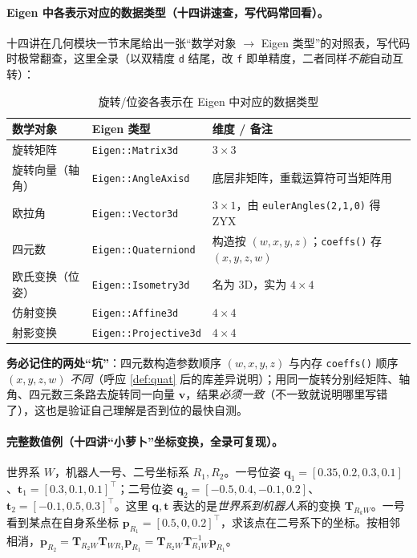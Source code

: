 \paragraph{Eigen 中各表示对应的数据类型（十四讲速查，写代码常回看）。}十四讲在几何模块一节末尾给出一张“数学对象 $\to$ Eigen 类型”的对照表，写代码时极常翻查，这里全录（以双精度 \texttt{d} 结尾，改 \texttt{f} 即单精度，二者同样\emph{不能}自动互转）：
\begin{table}[H]\centering\small
\caption{旋转/位姿各表示在 Eigen 中对应的数据类型}
\label{tab:rb-eigen-types}
\begin{tabular}{lll}
\toprule
数学对象 & Eigen 类型 & 维度 / 备注 \\
\midrule
旋转矩阵 & \texttt{Eigen::Matrix3d} & $3\times3$ \\
旋转向量（轴角） & \texttt{Eigen::AngleAxisd} & 底层非矩阵，重载运算符可当矩阵用 \\
欧拉角 & \texttt{Eigen::Vector3d} & $3\times1$，由 \texttt{eulerAngles(2,1,0)} 得 ZYX \\
四元数 & \texttt{Eigen::Quaterniond} & 构造按 $(w,x,y,z)$；\texttt{coeffs()} 存 $(x,y,z,w)$ \\
欧氏变换（位姿） & \texttt{Eigen::Isometry3d} & 名为 3D，实为 $4\times4$ \\
仿射变换 & \texttt{Eigen::Affine3d} & $4\times4$ \\
射影变换 & \texttt{Eigen::Projective3d} & $4\times4$ \\
\bottomrule
\end{tabular}
\end{table}
\noindent\textbf{务必记住的两处“坑”}：四元数构造参数顺序 $(w,x,y,z)$ 与内存 \texttt{coeffs()} 顺序 $(x,y,z,w)$ \emph{不同}（呼应 \cref{def:quat} 后的库差异说明）；用同一旋转分别经矩阵、轴角、四元数三条路去旋转同一向量 $\mathbf{v}$，结果\emph{必须一致}（不一致就说明哪里写错了），这也是验证自己理解是否到位的最快自测。

\paragraph{完整数值例（十四讲“小萝卜”坐标变换，全录可复现）。}世界系 $W$，机器人一号、二号坐标系 $R_1,R_2$。一号位姿 $\mathbf{q}_1=[0.35,0.2,0.3,0.1]$、$\mathbf{t}_1=[0.3,0.1,0.1]^\top$；二号位姿 $\mathbf{q}_2=[-0.5,0.4,-0.1,0.2]$、$\mathbf{t}_2=[-0.1,0.5,0.3]^\top$。这里 $\mathbf{q},\mathbf{t}$ 表达的是\emph{世界系到机器人系}的变换 $\mathbf{T}_{R_kW}$。一号看到某点在自身系坐标 $\mathbf{p}_{R_1}=[0.5,0,0.2]^\top$，求该点在二号系下的坐标。按相邻相消，$\mathbf{p}_{R_2}=\mathbf{T}_{R_2W}\mathbf{T}_{WR_1}\mathbf{p}_{R_1}=\mathbf{T}_{R_2W}\mathbf{T}_{R_1W}^{-1}\mathbf{p}_{R_1}$。

